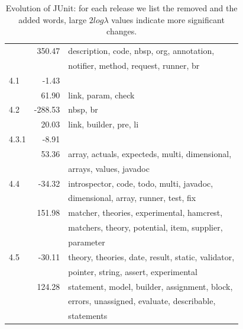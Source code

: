 \documentclass[10pt]{book}
\begin{document}
\begin{table}
{\begin{center}
\begin{tabular}{lrl}
~ & 350.47 & description, code, nbsp, org, annotation,\\~&~& notifier, method, request, runner, br \\
\hline
4.1 & -1.43 &  \\
~ & 61.90 & link, param, check \\
\hline
4.2 & -288.53 & nbsp, br \\
~ & 20.03 & link, builder, pre, li \\
\hline
4.3.1 & -8.91 &  \\
~ & 53.36 & array, actuals, expecteds, multi, dimensional,\\~&~& arrays, values, javadoc \\
\hline
4.4 & -34.32 & introspector, code, todo, multi, javadoc,\\~&~& dimensional, array, runner, test, fix \\
~ & 151.98 & matcher, theories, experimental, hamcrest,\\~&~& matchers, theory, potential, item, supplier,\\~&~& parameter \\
\hline
4.5 & -30.11 & theory, theories, date, result, static, validator,\\~&~& pointer, string, assert, experimental \\
~ & 124.28 & statement, model, builder, assignment, block,\\~&~& errors, unassigned, evaluate, describable,\\~&~& statements \\
\end{tabular}
\end{center}}
\caption{Evolution of JUnit: for each release we list the removed and the added words, large $2log\lambda$ values indicate more significant changes.}
\label{tab:two}
\end{table}%


\end{document}
